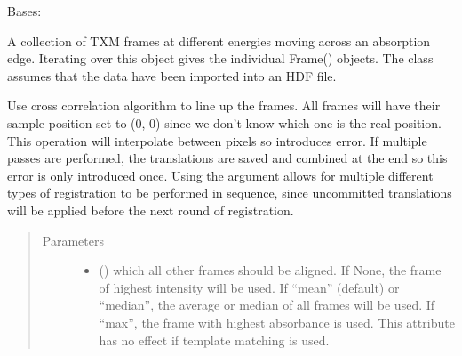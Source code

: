 \documentclass[letterpaper,10pt,english]{sphinxmanual}
\begin{document}
\begin{fulllineitems}
\label{\detokenize{xanespy:xanespy.xanes_frameset.XanesFrameset}}
Bases: 

A collection of TXM frames at different energies moving across an
absorption edge. Iterating over this object gives the individual
Frame() objects. The class assumes that the data have been
imported into an HDF file.

\begin{fulllineitems}
\label{\detokenize{xanespy:xanespy.xanes_frameset.XanesFrameset.active_group}}
\end{fulllineitems}


\begin{fulllineitems}
\label{\detokenize{xanespy:xanespy.xanes_frameset.XanesFrameset.align_frames}}
Use cross correlation algorithm to line up the frames. All frames
will have their sample position set to (0, 0) since we don’t
know which one is the real position. This operation will
interpolate between pixels so introduces error. If multiple
passes are performed, the translations are saved and combined
at the end so this error is only introduced once. Using the
 argument allows for multiple different types of
registration to be performed in sequence, since uncommitted
translations will be applied before the next round of
registration.
\begin{quote}\begin{description}
\item[{Parameters}] \leavevmode\begin{itemize}
\item {} 
\sphinxstyleliteralstrong{(}\sphinxstyleliteralstrong{, }\sphinxstyleliteralstrong{)} () \textendash{} which all other frames should be aligned. If None, the frame
of highest intensity will be used. If “mean” (default) or
“median”, the average or median of all frames will be
used. If “max”, the frame with highest absorbance is
used. This attribute has no effect if template matching is
used.


\end{itemize}
\end{description}
\end{quote}
\end{fulllineitems}
\end{fulllineitems}
\end{document}
